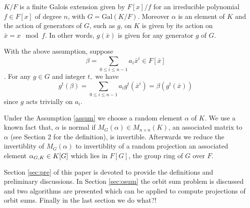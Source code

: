 \begin{assumption}
  \label{assum}
  $K/F$ is a finite Galois extension given by $ F[x]/f$ for an irreducible
  polynomial $f\in F[x]$ of degree $n$, with $G =
  \mathrm{Gal}(K/F)$. Moreover $\alpha$ is an element of $K$ and the action
  of generators of $ G$, such as $g$, on $K$ is given by its action on
  $\bar{x} = x \mod f.$ In other words, $g(\bar{x})$ is given for any
  generator $g$ of $G$.
\end{assumption}

\begin{remark}
  With the above assumption, suppose
  $$\beta = \sum_{0\leq i \leq n-1} a_i \bar{x}^i \in F[\bar{x}]$$. For any
  $g \in G$ and integer $t,$ we have
\begin{equation}\label{rmk:comute}
g^t(\beta) = \sum_{0\leq i \leq n-1} a_i g^t(\bar{x}^i) = \beta(g^t(\bar{x}))
\end{equation}
since $g$ acts trivially on $a_i$.
\end{remark}

Under the Assumption \ref{assum} we choose a random element $\alpha$ of
$K$. We use a known fact that, $\alpha$ is normal if
$M_G(\alpha) \in M_{n\times n}(K)$, an associated matrix to $\alpha$ (see
Section 2 for the definition), is invertible.  Afterwards we reduce the
invertiblity of $M_G(\alpha)$ to invertiblity of a random projection an
associated element $\alpha_{G,K} \in K[G]$ which lies in $F[G]$, the group
ring of $G$ over $F$.

Section \ref{sec:pre} of this paper is devoted to provide the definitions
and preliminary discussions. In Section \ref{sec:osum} the orbit sum
problem is discussed and two algorithms are presented which can be applied
to compute projections of orbit sums.  Finally in the last section we do
what?!

